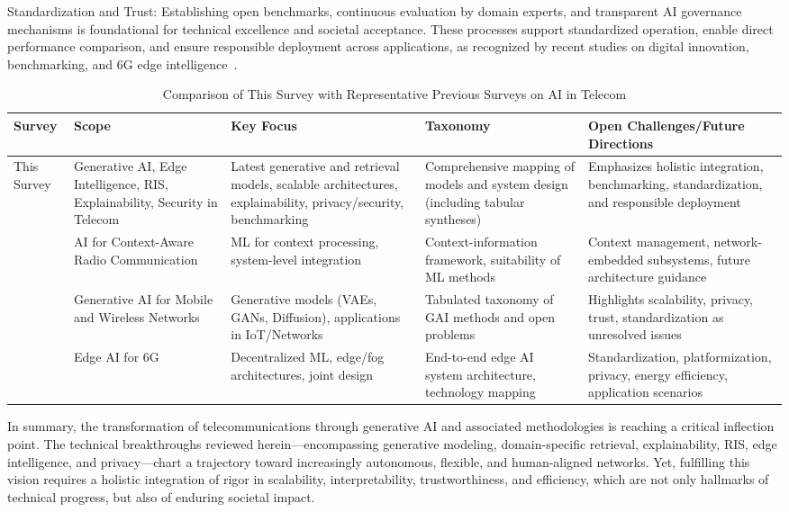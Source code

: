 \documentclass[sigconf]{acmart}
\begin{document}
Standardization and Trust: Establishing open benchmarks, continuous evaluation by domain experts, and transparent AI governance mechanisms is foundational for technical excellence and societal acceptance. These processes support standardized operation, enable direct performance comparison, and ensure responsible deployment across applications, as recognized by recent studies on digital innovation, benchmarking, and 6G edge intelligence~\cite{ref13,ref19,ref28,ref42,ref49}.

\begin{table*}[htbp]
\centering
\caption{Comparison of This Survey with Representative Previous Surveys on AI in Telecom}
\label{tab:survey_comparison}
\begin{adjustbox}{max width=\textwidth}
\begin{tabular}{@{}lllll@{}}
\toprule
Survey & Scope & Key Focus & Taxonomy & Open Challenges/Future Directions \\
\midrule
This Survey & Generative AI, Edge Intelligence, RIS, Explainability, Security in Telecom & Latest generative and retrieval models, scalable architectures, explainability, privacy/security, benchmarking & Comprehensive mapping of models and system design (including tabular syntheses) & Emphasizes holistic integration, benchmarking, standardization, and responsible deployment \\
\cite{ref28} & AI for Context-Aware Radio Communication & ML for context processing, system-level integration & Context-information framework, suitability of ML methods & Context management, network-embedded subsystems, future architecture guidance \\
\cite{ref44} & Generative AI for Mobile and Wireless Networks & Generative models (VAEs, GANs, Diffusion), applications in IoT/Networks & Tabulated taxonomy of GAI methods and open problems & Highlights scalability, privacy, trust, standardization as unresolved issues \\
\cite{ref49} & Edge AI for 6G & Decentralized ML, edge/fog architectures, joint design & End-to-end edge AI system architecture, technology mapping & Standardization, platformization, privacy, energy efficiency, application scenarios \\
\bottomrule
\end{tabular}
\end{adjustbox}
\end{table*}

In summary, the transformation of telecommunications through generative AI and associated methodologies is reaching a critical inflection point. The technical breakthroughs reviewed herein—encompassing generative modeling, domain-specific retrieval, explainability, RIS, edge intelligence, and privacy—chart a trajectory toward increasingly autonomous, flexible, and human-aligned networks. Yet, fulfilling this vision requires a holistic integration of rigor in scalability, interpretability, trustworthiness, and efficiency, which are not only hallmarks of technical progress, but also of enduring societal impact.






\end{document}

